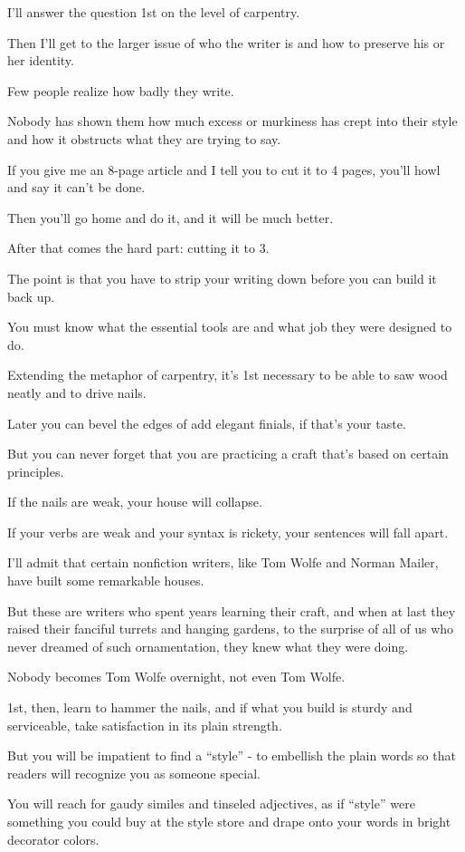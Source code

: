 \documentclass{book}
\numberwithin{equation}{section}
\begin{document}
%
I'll answer the question 1st on the level of carpentry.

Then I'll get to the larger issue of who the writer is and how to preserve his or her identity.

%
Few people realize how badly they write.

Nobody has shown them how much excess or murkiness has crept into their style and how it obstructs what they are trying to say.

If you give me an 8-page article and I tell you to cut it to 4 pages, you'll howl and say it can't be done.

Then you'll go home and do it, and it will be much better.

After that comes the hard part: cutting it to 3.

%
The point is that you have to strip your writing down before you can build it back up.

You must know what the essential tools are and what job they were designed to do.

Extending the metaphor of carpentry, it's 1st necessary to be able to saw wood neatly and to drive nails.

Later you can bevel the edges of add elegant finials, if that's your taste.

But you can never forget that you are practicing a craft that's based on certain principles.

If the nails are weak, your house will collapse.

If your verbs are weak and your syntax is rickety, your sentences will fall apart.

I'll admit that certain nonfiction writers, like Tom Wolfe and Norman Mailer, have built some remarkable houses.

But these are writers who spent years learning their craft, and when at last they raised their fanciful turrets and hanging gardens, to the surprise of all of us who never dreamed of such ornamentation, they knew what they were doing.

Nobody becomes Tom Wolfe overnight, not even Tom Wolfe.

%
1st, then, learn to hammer the nails, and if what you build is sturdy and serviceable, take satisfaction in its plain strength.

%
But you will be impatient to find a ``style'' - to embellish the plain words so that readers will recognize you as someone special.

You will reach for gaudy similes and tinseled adjectives, as if ``style'' were something you could buy at the style store and drape onto your words in bright decorator colors.
\end{document}
